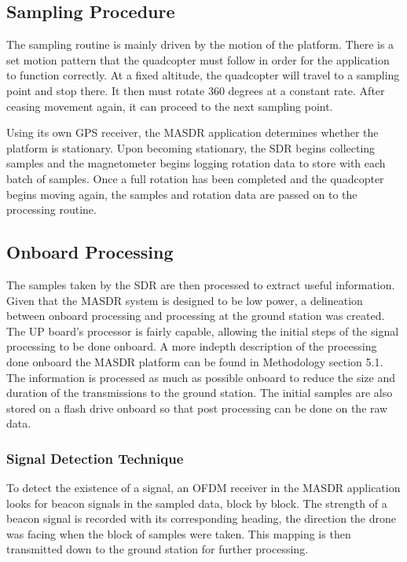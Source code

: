 \subsection{Sampling Procedure}
The sampling routine is mainly driven by the motion of the platform. There is a set motion pattern that the quadcopter must follow in order for the application to function correctly. At a fixed altitude, the quadcopter will travel to a sampling point and stop there. It then must rotate 360 degrees at a constant rate. After ceasing movement again, it can proceed to the next sampling point. \par
Using its own GPS receiver, the MASDR application determines whether the platform is stationary. Upon becoming stationary, the SDR begins collecting samples and the magnetometer begins logging rotation data to store with each batch of samples. Once a full rotation has been completed and the quadcopter begins moving again, the samples and rotation data are passed on to the processing routine.
\subsection{Onboard Processing}
The samples taken by the SDR are then processed to extract useful information. Given that the MASDR system is designed to be low power, a delineation between onboard processing and processing at the ground station was created. The UP board’s processor is fairly capable, allowing the initial steps of the signal processing to be done onboard. A more indepth description of the processing done onboard the MASDR platform can be found in Methodology section 5.1. The information is processed as much as possible onboard to reduce the size and duration of the transmissions to the ground station. The initial samples are also stored on a flash drive onboard so that post processing can be done on the raw data.
\subsubsection{Signal Detection Technique}
To detect the existence of a signal, an OFDM receiver in the MASDR application looks for beacon signals in the sampled data, block by block. The strength of a beacon signal is recorded with its corresponding heading, the direction the drone was facing when the block of samples were taken. This mapping is then transmitted down to the ground station for further processing.
